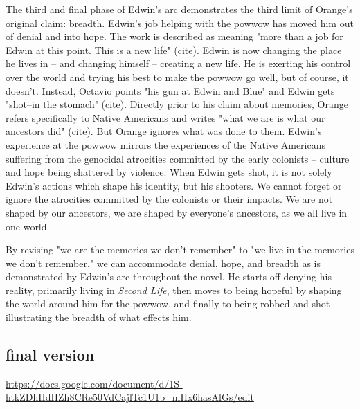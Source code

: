 \documentclass[letterpaper]{article}
\begin{document}
\begin{enumerate}
The third and final phase of Edwin's arc demonstrates the third limit of
Orange's original claim: breadth. Edwin's job helping with the powwow
has moved him out of denial and into hope. The work is described as
meaning "more than a job for Edwin at this point. This is a new life"
(cite). Edwin is now changing the place he lives in -- and changing
himself -- creating a new life. He is exerting his control over the
world and trying his best to make the powwow go well, but of course, it
doesn't. Instead, Octavio points "his gun at Edwin and Blue" and Edwin
gets "shot--in the stomach" (cite). Directly prior to his claim about
memories, Orange refers specifically to Native Americans and writes
"what we are is what our ancestors did" (cite). But Orange ignores what
was done to them. Edwin's experience at the powwow mirrors the
experiences of the Native Americans suffering from the genocidal
atrocities committed by the early colonists -- culture and hope being
shattered by violence. When Edwin gets shot, it is not solely Edwin's
actions which shape his identity, but his shooters. We cannot forget or
ignore the atrocities committed by the colonists or their impacts. We
are not shaped by our ancestors, we are shaped by everyone's ancestors,
as we all live in one world.

By revising "we are the memories we don't remember" to "we live in the
memories we don't remember," we can accommodate denial, hope, and
breadth as is demonstrated by Edwin's arc throughout the novel. He
starts off denying his reality, primarily living in \emph{Second Life}, then
moves to being hopeful by shaping the world around him for the powwow,
and finally to being robbed and shot illustrating the breadth of what
effects him.
\end{enumerate}

\subsection{final version}
\label{sec:org4c01126}
\url{https://docs.google.com/document/d/1S-htkZDhHdHZh8CRe50VdCajlTc1U1b\_mHx6hasAlGs/edit}
\end{document}
